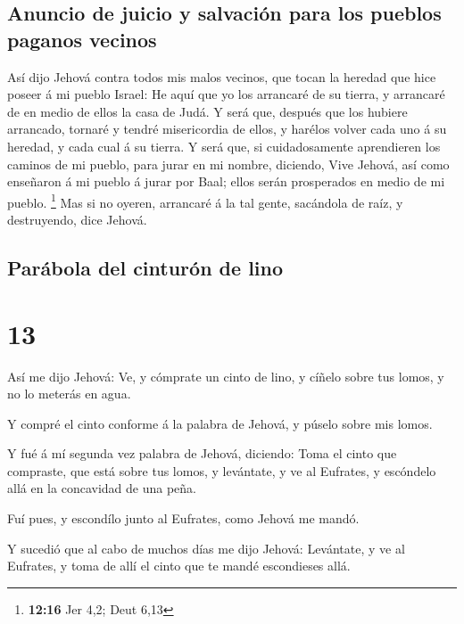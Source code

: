 \hypertarget{anuncio-de-juicio-y-salvaciuxf3n-para-los-pueblos-paganos-vecinos}{%
\subsection{Anuncio de juicio y salvación para los pueblos paganos
vecinos}\label{anuncio-de-juicio-y-salvaciuxf3n-para-los-pueblos-paganos-vecinos}}

 Así dijo Jehová contra todos mis malos vecinos, que tocan
la heredad que hice poseer á mi pueblo Israel: He aquí que yo los
arrancaré de su tierra, y arrancaré de en medio de ellos la casa de
Judá.  Y será que, después que los hubiere arrancado,
tornaré y tendré misericordia de ellos, y harélos volver cada uno á su
heredad, y cada cual á su tierra.  Y será que, si
cuidadosamente aprendieren los caminos de mi pueblo, para jurar en mi
nombre, diciendo, Vive Jehová, así como enseñaron á mi pueblo á jurar
por Baal; ellos serán prosperados en medio de mi pueblo. \footnote{\textbf{12:16}
  Jer 4,2; Deut 6,13}  Mas si no oyeren, arrancaré á la tal
gente, sacándola de raíz, y destruyendo, dice Jehová.

\hypertarget{paruxe1bola-del-cinturuxf3n-de-lino}{%
\subsection{Parábola del cinturón de
lino}\label{paruxe1bola-del-cinturuxf3n-de-lino}}

\hypertarget{section-12}{%
\section{13}\label{section-12}}

 Así me dijo Jehová: Ve, y cómprate un cinto de lino, y
cíñelo sobre tus lomos, y no lo meterás en agua.

 Y compré el cinto conforme á la palabra de Jehová, y púselo
sobre mis lomos.

 Y fué á mí segunda vez palabra de Jehová, diciendo:
 Toma el cinto que compraste, que está sobre tus lomos, y
levántate, y ve al Eufrates, y escóndelo allá en la concavidad de una
peña.

 Fuí pues, y escondílo junto al Eufrates, como Jehová me
mandó.

 Y sucedió que al cabo de muchos días me dijo Jehová:
Levántate, y ve al Eufrates, y toma de allí el cinto que te mandé
escondieses allá.

